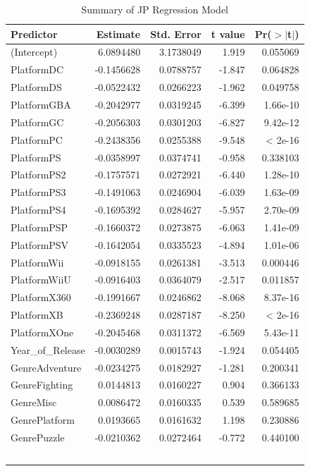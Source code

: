 \documentclass[12pt]{article}
\begin{document}
\begin{table}[ht]
  \caption{Summary of JP Regression Model}
  \label{tab:JP}
\centering
\begin{tabular}{lrrrr}
\hline
Predictor & Estimate & Std. Error & t value & Pr($>$$|$t$|$) \\ 
\hline
(Intercept) & 6.0894480 & 3.1738049 & 1.919 & 0.055069 \\
PlatformDC & -0.1456628 & 0.0788757 & -1.847 & 0.064828 \\
PlatformDS & -0.0522432 & 0.0266223 & -1.962 & 0.049758 \\
PlatformGBA & -0.2042977 & 0.0319245 & -6.399 & 1.66e-10 \\
PlatformGC & -0.2056303 & 0.0301203 & -6.827 & 9.42e-12 \\
PlatformPC & -0.2438356 & 0.0255388 & -9.548 & < 2e-16 \\
PlatformPS & -0.0358997 & 0.0374741 & -0.958 & 0.338103 \\
PlatformPS2 & -0.1757571 & 0.0272921 & -6.440 & 1.28e-10 \\
PlatformPS3 & -0.1491063 & 0.0246904 & -6.039 & 1.63e-09 \\
PlatformPS4 & -0.1695392 & 0.0284627 & -5.957 & 2.70e-09 \\
PlatformPSP & -0.1660372 & 0.0273875 & -6.063 & 1.41e-09 \\
PlatformPSV & -0.1642054 & 0.0335523 & -4.894 & 1.01e-06 \\
PlatformWii & -0.0918155 & 0.0261381 & -3.513 & 0.000446 \\
PlatformWiiU & -0.0916403 & 0.0364079 & -2.517 & 0.011857 \\
PlatformX360 & -0.1991667 & 0.0246862 & -8.068 & 8.37e-16 \\
PlatformXB & -0.2369248 & 0.0287187 & -8.250 & < 2e-16 \\
PlatformXOne & -0.2045468 & 0.0311372 & -6.569 & 5.43e-11 \\
Year_of_Release & -0.0030289 & 0.0015743 & -1.924 & 0.054405 \\
GenreAdventure & -0.0234275 & 0.0182927 & -1.281 & 0.200341 \\
GenreFighting & 0.0144813 & 0.0160227 & 0.904 & 0.366133 \\
GenreMisc & 0.0086472 & 0.0160335 & 0.539 & 0.589685 \\
GenrePlatform & 0.0193665 & 0.0161632 & 1.198 & 0.230886 \\
GenrePuzzle & -0.0210362 & 0.0272464 & -0.772 & 0.440100 \\
$$
\end{tabular}
\end{table}
\end{document}
